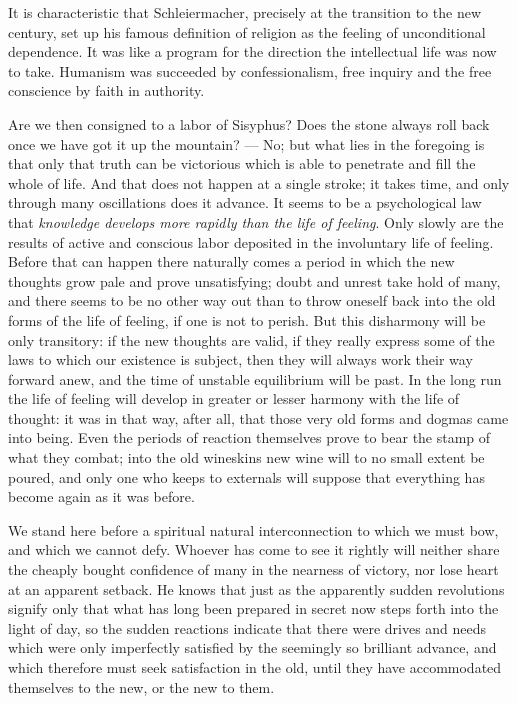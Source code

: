 \documentclass[12pt,a4paper,openany]{book}
\newcommand{\opage}[1]{\marginnote{\footnotesize\textit{[#1]}}}
\begin{document}
It is characteristic that Schleiermacher, precisely at the transition to the
new century, set up his famous definition of religion as the feeling of
unconditional dependence. It was like a program for the direction the
intellectual life was now to take. Humanism was succeeded by confessionalism, free inquiry
and the free conscience by faith in authority.

Are we then consigned to a labor of Sisyphus? Does the stone always roll back
once we have got it up the mountain? --- No; but what lies in the foregoing is
that only that truth can be victorious which is able to penetrate and fill the
whole of life. And that does not happen at a single stroke; it takes time, and
only through many oscillations does it advance. It seems to be a psychological
law that \emph{knowledge develops more rapidly than the life of feeling}. Only slowly
are the results of active
\opage{205}and conscious labor deposited in the involuntary life
of feeling. Before that can happen there naturally comes a period in which the
new thoughts grow pale and prove unsatisfying; doubt and unrest take hold of
many, and there seems to be no other way out than to throw oneself back into
the old forms of the life of feeling, if one is not to perish. But this
disharmony will be only transitory: if the new thoughts are valid, if they
really express some of the laws to which our existence is subject, then they
will always work their way forward anew, and the time of unstable equilibrium
will be past. In the long run the life of feeling will develop in greater or
lesser harmony with the life of thought: it was in that way, after all, that
those very old forms and dogmas came into being. Even the periods of reaction
themselves prove to bear the stamp of what they combat; into the old
wineskins new wine will to no small extent be poured, and only one who keeps
to externals will suppose that everything has become again as it was before.

We stand here before a spiritual natural interconnection to which we must bow,
and which we cannot defy. Whoever has come to see it rightly will neither
share the cheaply bought confidence of many in the nearness of victory, nor
lose heart at an apparent setback. He knows that just as the apparently sudden
revolutions signify only that what has long been prepared in secret now steps
forth into the light of day, so the sudden reactions indicate that there were
drives and needs which were only imperfectly satisfied by the seemingly so
brilliant advance, and which therefore must seek satisfaction in the old,
until they have accommodated themselves to the new, or the new to them.
\end{document}
